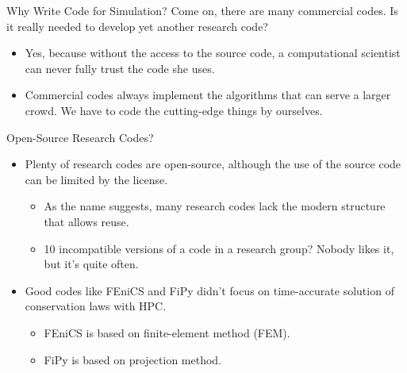 \documentclass[dvips,xcolor=pst,14pt]{beamer}
\begin{document}
\begin{frame}{
%
Why Write Code for Simulation?
%
}
Come on, there are many commercial codes.  Is it really needed to develop yet
another research code?
\begin{itemize}
  \item Yes, because without the access to the source code, a computational
  scientist can never fully trust the code she uses.
  \item Commercial codes always implement the algorithms that can serve a
  larger crowd.  We have to code the cutting-edge things by ourselves.
\end{itemize}
\end{frame}

\begin{frame}{
%
Open-Source Research Codes?
%
}
\begin{itemize}
  \item Plenty of research codes are open-source, although the use of the
  source code can be limited by the license.
  \begin{itemize}
    \item As the name suggests, many research codes lack the modern structure
    that allows reuse.
    \item 10 incompatible versions of a code in a research group?  Nobody likes
    it, but it's quite often.
  \end{itemize}
  \item Good codes like FEniCS and FiPy didn't focus on time-accurate solution
  of conservation laws with HPC.
  \begin{itemize}
    \item FEniCS is based on finite-element method (FEM).
    \item FiPy is based on projection method.
  \end{itemize}
\end{itemize}
\end{frame}
\end{document}
